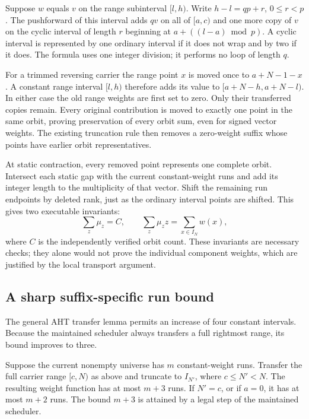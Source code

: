 Suppose $w$ equals $v$ on the range subinterval $[l,h)$. Write
$h-l=qp+r$, $0\le r<p$. The pushforward of this interval adds $qv$ on
all of $[a,c)$ and one more copy of $v$ on the cyclic interval of length
$r$ beginning at $a+((l-a)\bmod p)$. A cyclic interval is represented by
one ordinary interval if it does not wrap and by two if it does. The
formula uses one integer division; it performs no loop of length $q$.

For a trimmed reversing carrier the range point $x$ is moved once to
$a+N-1-x$. A constant range interval $[l,h)$ therefore adds its value to
$[a+N-h,a+N-l)$. In either case the old range weights are first set to
zero. Only their transferred copies remain. Every original contribution
is moved to exactly one point in the same orbit, proving preservation of
every orbit sum, even for signed vector weights. The existing truncation
rule then removes a zero-weight suffix whose points have earlier orbit
representatives.

At static contraction, every removed point represents one complete orbit.
Intersect each static gap with the current constant-weight runs and add
its integer length to the multiplicity of that vector. Shift the remaining
run endpoints by deleted rank, just as the ordinary interval points are
shifted. This gives two executable invariants:
\[
 \sum_z\mu_z=C,\qquad
 \sum_z\mu_z z=\sum_{x\in I_N}w(x),
\]
where $C$ is the independently verified orbit count. These invariants are
necessary checks; they alone would not prove the individual component
weights, which are justified by the local transport argument.

\subsection{A sharp suffix-specific run bound}

The general AHT transfer lemma permits an increase of four constant
intervals. Because the maintained scheduler always transfers a full
rightmost range, its bound improves to three.

\begin{proposition}
Suppose the current nonempty universe has $m$ constant-weight runs.
Transfer the full carrier range $[c,N)$ as above and truncate to
$I_{N'}$, where $c\le N'<N$. The resulting weight function has at most
$m+3$ runs. If $N'=c$, or if $a=0$, it has at most $m+2$ runs.
The bound $m+3$ is attained by a legal step of the maintained scheduler.
\end{proposition}

